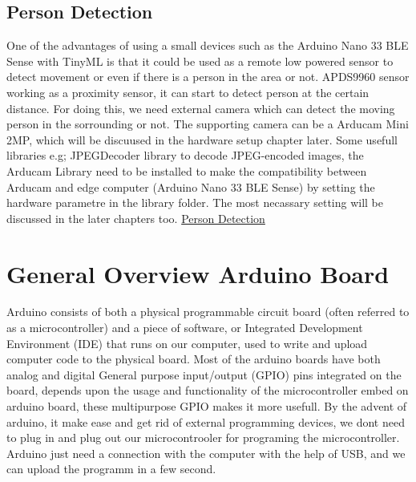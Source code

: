 \subsection{Person Detection} 

One of the advantages of using a small devices such as the Arduino Nano 33 BLE Sense with TinyML is that it could be used as a remote low powered sensor to detect movement or even if there is a person in the area or not. APDS9960 sensor working as a proximity sensor, it can start to detect person at the certain distance. For doing this, we need external camera which can detect the moving person in the sorrounding or not. The supporting camera can be a Arducam Mini 2MP, which will be discuused in the hardware setup chapter later. Some usefull libraries e.g; JPEGDecoder library to decode JPEG-encoded images, the Arducam Library  need to be installed to make the compatibility between Arducam and edge computer (Arduino Nano 33 BLE Sense) by setting the hardware parametre in the library folder. The most necassary setting will be discussed in the later chapters too. \href{https://www.element14.com/community/community/project14/nano-rama/blog/2020/04/29/tinyml-on-arduino-nano-33-ble-sense-person-detection-with-ble}{Person Detection}

\section{General Overview Arduino Board}

Arduino consists of both a physical programmable circuit board (often referred to as a microcontroller) and a piece of software, or Integrated Development Environment (IDE) that runs on our computer, used to write and upload computer code to the physical board. Most of the arduino boards have both analog and digital General purpose input/output (GPIO) pins integrated on the board, depends upon the usage and functionality of the microcontroller embed on arduino board, these multipurpose GPIO makes it more usefull. By the advent of arduino, it make ease and get rid of external programming devices, we dont need to plug in and plug out our microcontrooler for programing the microcontroller. Arduino just need a connection with the computer with the help of USB, and we can upload the programm in a few second. \cite{Arduino:2021b}


